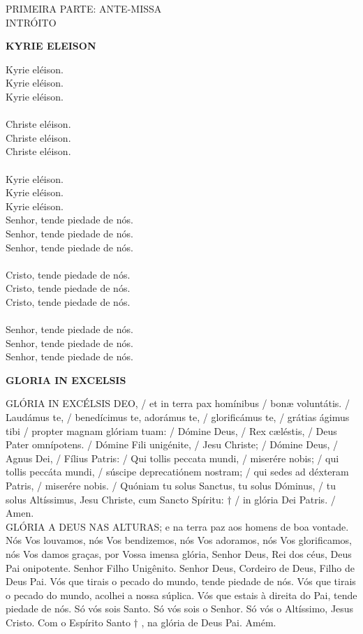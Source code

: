 \newpage
\begin{center}
	PRIMEIRA PARTE: ANTE-MISSA
	\\INTRÓITO
\end{center}
\begin{center}
\textbf{KYRIE ELEISON}
\end{center}

\begin{multicols}{2}
\noindent
Kyrie eléison.
\\Kyrie eléison.
\\Kyrie eléison.
\\
\\Christe eléison.
\\Christe eléison.
\\Christe eléison.
\\
\\Kyrie eléison.
\\Kyrie eléison.
\\Kyrie eléison.
\\Senhor, tende piedade de nós.
\\Senhor, tende piedade de nós.
\\Senhor, tende piedade de nós.
\\
\\Cristo, tende piedade de nós.
\\Cristo, tende piedade de nós.
\\Cristo, tende piedade de nós.
\\
\\Senhor, tende piedade de nós.
\\Senhor, tende piedade de nós.
\\Senhor, tende piedade de nós.
\end{multicols}
\begin{center}
	\textbf{GLORIA IN EXCELSIS}
\end{center}
\begin{multicols}{2}
\noindent 
GLÓRIA IN EXCÉLSIS DEO, / et in terra pax homínibus / bonæ voluntátis. /
Laudámus te, / benedícimus te, adorámus te, / glorificámus te, / grátias ágimus tibi /
propter magnam glóriam tuam: / Dómine Deus, / Rex cæléstis, / Deus Pater omnípotens. / 
Dómine Fili unigénite, /
Jesu Christe; / Dómine Deus, / Agnus Dei,
/ Fílius Patris: / Qui tollis peccata mundi, /
miserére nobis; / qui tollis peccáta mundi,
/ súscipe deprecatiónem nostram; / qui sedes ad déxteram Patris, / miserére nobis.
/ Quóniam tu solus Sanctus, tu solus
Dóminus, / tu solus Altíssimus, Jesu Christe, cum Sancto Spíritu: $\dag$ / in glória Dei Patris. / Amen.
\\ GLÓRIA A DEUS NAS ALTURAS; e na
terra paz aos homens de boa vontade.
Nós Vos
louvamos,
nós
Vos
bendizemos, nós Vos adoramos, nós Vos
glorificamos, nós Vos damos graças, por
Vossa imensa glória, Senhor Deus, Rei
dos céus, Deus Pai onipotente. Senhor
Filho Unigênito. Senhor Deus, Cordeiro
de Deus, Filho de Deus Pai. Vós que
tirais o pecado do mundo, tende
piedade de nós. Vós que tirais o pecado
do mundo, acolhei a nossa súplica. Vós
que estais à direita do Pai, tende
piedade de nós. Só vós sois Santo. Só
vós sois o Senhor. Só vós o Altíssimo,
Jesus Cristo. Com o Espírito Santo $\dag$ ,
na glória de Deus Pai. Amém.
\end{multicols}

